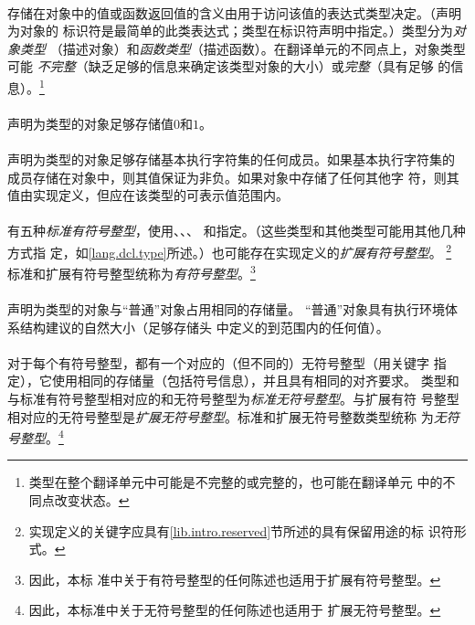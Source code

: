 {                                                 
\paragraph{}
存储在对象中的值或函数返回值的含义由用于访问该值的表达式类型决定。（声明为对象的
标识符是最简单的此类表达式；类型在标识符声明中指定。）类型分为\textit{对象类型}
（描述对象）和\textit{函数类型}（描述函数）。在翻译单元的不同点上，对象类型可能
\textit{不完整}（缺乏足够的信息来确定该类型对象的大小）或\textit{完整}（具有足够
的信息）。\footnote{类型在整个翻译单元中可能是不完整的或完整的，也可能在翻译单元
中的不同点改变状态。}

\paragraph{}
声明为类型的对象足够存储值$0$和$1$。

\paragraph{}
声明为类型的对象足够存储基本执行字符集的任何成员。如果基本执行字符集的
成员存储在对象中，则其值保证为非负。如果对象中存储了任何其他字
符，则其值由实现定义，但应在该类型的可表示值范围内。

\paragraph{}
有五种\textit{标准有符号整型}，使用、、、
和指定。（这些类型和其他类型可能用其他几种方式指
定，如\ref{lang.dcl.type}所述。）也可能存在实现定义的\textit{扩展有符号整型}。
\footnote{实现定义的关键字应具有\ref{lib.intro.reserved}节所述的具有保留用途的标
识符形式。} 标准和扩展有符号整型统称为\textit{有符号整型}。\footnote{因此，本标
准中关于有符号整型的任何陈述也适用于扩展有符号整型。}

\paragraph{}
声明为类型的对象与``普通''对象占用相同的存储量。
``普通''对象具有执行环境体系结构建议的自然大小（足够存储头
中定义的到范围内的任何值）。

\paragraph{}
对于每个有符号整型，都有一个对应的（但不同的）无符号整型（用关键字
指定），它使用相同的存储量（包括符号信息），并且具有相同的对齐要求。
类型和与标准有符号整型相对应的和无符号整型为\textit{标准无符号整型}。与扩展有符
号整型相对应的无符号整型是\textit{扩展无符号整型}。标准和扩展无符号整数类型统称
为\textit{无符号整型}。\footnote{因此，本标准中关于无符号整型的任何陈述也适用于
扩展无符号整型。}

}

